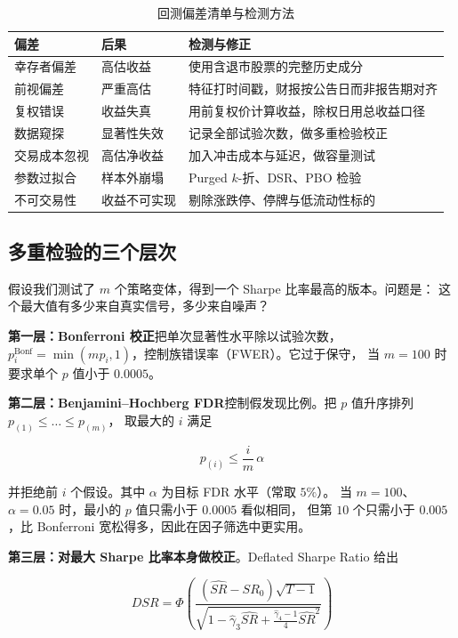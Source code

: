 \begin{table}[htbp]
\centering
\caption{回测偏差清单与检测方法}\label{tab:07-biases}
\tablefont
\begin{tabular}{@{}llL{5.8cm}@{}}
\toprule
偏差 & 后果 & 检测与修正 \\
\midrule
幸存者偏差 & 高估收益 & 使用含退市股票的完整历史成分 \\
前视偏差 & 严重高估 & 特征打时间戳，财报按公告日而非报告期对齐 \\
复权错误 & 收益失真 & 用前复权价计算收益，除权日用总收益口径 \\
数据窥探 & 显著性失效 & 记录全部试验次数，做多重检验校正 \\
交易成本忽视 & 高估净收益 & 加入冲击成本与延迟，做容量测试 \\
参数过拟合 & 样本外崩塌 & Purged $k$-折、DSR、PBO 检验 \\
不可交易性 & 收益不可实现 & 剔除涨跌停、停牌与低流动性标的 \\
\bottomrule
\end{tabular}
\end{table}

\subsection{多重检验的三个层次}

假设我们测试了 $m$ 个策略变体，得到一个 Sharpe 比率最高的版本。问题是：
这个最大值有多少来自真实信号，多少来自噪声？

\textbf{第一层：Bonferroni 校正}把单次显著性水平除以试验次数，
$p_i^{\text{Bonf}} = \min(m p_i, 1)$，控制族错误率（FWER）。它过于保守，
当 $m = 100$ 时要求单个 $p$ 值小于 $0.0005$。

\textbf{第二层：Benjamini--Hochberg FDR}控制假发现比例。把 $p$ 值升序排列 $p_{(1)} \le \dots \le p_{(m)}$，
取最大的 $i$ 满足

\begin{equation}
  p_{(i)} \le \frac{i}{m}\,\alpha
  \label{eq:07-bh}
\end{equation}

并拒绝前 $i$ 个假设。其中 $\alpha$ 为目标 FDR 水平（常取 $5\%$）。
当 $m = 100$、$\alpha = 0.05$ 时，最小的 $p$ 值只需小于 $0.0005$ 看似相同，
但第 $10$ 个只需小于 $0.005$，比 Bonferroni 宽松得多，因此在因子筛选中更实用。

\textbf{第三层：对最大 Sharpe 比率本身做校正}。Deflated Sharpe Ratio 给出

\begin{equation}
  DSR = \Phi\!\left(\frac{\left(\widehat{SR} - SR_0\right)\sqrt{T-1}}{\sqrt{1 - \hat{\gamma}_3 \widehat{SR} + \frac{\hat{\gamma}_4 - 1}{4}\widehat{SR}^{2}}}\right)
  \label{eq:07-dsr}
\end{equation}

